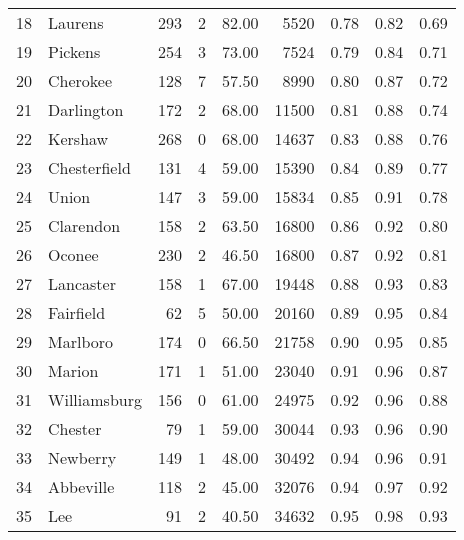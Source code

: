 \begin{tabular}{llrrrrrrr}
18 &       Laurens &   293 &      2 &  82.00 &          5520 &       0.78 &        0.82 &        0.69 \\
19 &       Pickens &   254 &      3 &  73.00 &          7524 &       0.79 &        0.84 &        0.71 \\
20 &      Cherokee &   128 &      7 &  57.50 &          8990 &       0.80 &        0.87 &        0.72 \\
21 &    Darlington &   172 &      2 &  68.00 &         11500 &       0.81 &        0.88 &        0.74 \\
22 &       Kershaw &   268 &      0 &  68.00 &         14637 &       0.83 &        0.88 &        0.76 \\
23 &  Chesterfield &   131 &      4 &  59.00 &         15390 &       0.84 &        0.89 &        0.77 \\
24 &         Union &   147 &      3 &  59.00 &         15834 &       0.85 &        0.91 &        0.78 \\
25 &     Clarendon &   158 &      2 &  63.50 &         16800 &       0.86 &        0.92 &        0.80 \\
26 &        Oconee &   230 &      2 &  46.50 &         16800 &       0.87 &        0.92 &        0.81 \\
27 &     Lancaster &   158 &      1 &  67.00 &         19448 &       0.88 &        0.93 &        0.83 \\
28 &     Fairfield &    62 &      5 &  50.00 &         20160 &       0.89 &        0.95 &        0.84 \\
29 &      Marlboro &   174 &      0 &  66.50 &         21758 &       0.90 &        0.95 &        0.85 \\
30 &        Marion &   171 &      1 &  51.00 &         23040 &       0.91 &        0.96 &        0.87 \\
31 &  Williamsburg &   156 &      0 &  61.00 &         24975 &       0.92 &        0.96 &        0.88 \\
32 &       Chester &    79 &      1 &  59.00 &         30044 &       0.93 &        0.96 &        0.90 \\
33 &      Newberry &   149 &      1 &  48.00 &         30492 &       0.94 &        0.96 &        0.91 \\
34 &     Abbeville &   118 &      2 &  45.00 &         32076 &       0.94 &        0.97 &        0.92 \\
35 &           Lee &    91 &      2 &  40.50 &         34632 &       0.95 &        0.98 &        0.93 \\

\end{tabular}
